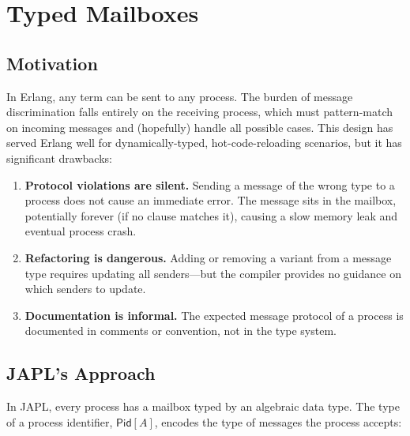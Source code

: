 \documentclass[11pt,a4paper]{article}
\newcommand{\Pid}{\mathsf{Pid}}
\begin{document}
\section{Typed Mailboxes}\label{sec:typed-mailboxes}

\subsection{Motivation}

In Erlang, any term can be sent to any process. The burden of message discrimination falls entirely on the receiving process, which must pattern-match on incoming messages and (hopefully) handle all possible cases. This design has served Erlang well for dynamically-typed, hot-code-reloading scenarios, but it has significant drawbacks:

\begin{enumerate}
\item \textbf{Protocol violations are silent.} Sending a message of the wrong type to a process does not cause an immediate error. The message sits in the mailbox, potentially forever (if no clause matches it), causing a slow memory leak and eventual process crash.

\item \textbf{Refactoring is dangerous.} Adding or removing a variant from a message type requires updating all senders---but the compiler provides no guidance on which senders to update.

\item \textbf{Documentation is informal.} The expected message protocol of a process is documented in comments or convention, not in the type system.
\end{enumerate}

\subsection{JAPL's Approach}

In JAPL, every process has a mailbox typed by an algebraic data type. The type of a process identifier, $\Pid[A]$, encodes the type of messages the process accepts:
\end{document}
